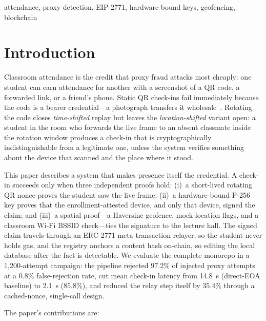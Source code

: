 \documentclass[conference]{IEEEtran}
\begin{document}
\begin{IEEEkeywords}
attendance, proxy detection, EIP-2771, hardware-bound keys, geofencing,
blockchain
\end{IEEEkeywords}

\section{Introduction}
Classroom attendance is the credit that proxy fraud attacks
most cheaply: one student can earn attendance for another with a screenshot of
a QR code, a forwarded link, or a friend's phone. Static QR check-ins fail
immediately because the code is a bearer credential---a photograph transfers
it wholesale~\cite{nuhi2020smartattendance,liew2021qrattendance}. Rotating
the code closes \emph{time-shifted} replay but leaves the
\emph{location-shifted} variant open: a student in the room who forwards the
live frame to an absent classmate inside the rotation window produces a
check-in that is cryptographically indistinguishable from a legitimate one,
unless the system verifies something about the device that scanned and the
place where it stood.

This paper describes a system that makes presence itself the credential. A
check-in succeeds only when three independent proofs hold: (i)~a
short-lived rotating QR nonce proves the student saw the live frame;
(ii)~a hardware-bound P-256 key proves that the enrollment-attested device,
and only that device, signed the claim; and (iii)~a spatial proof---a
Haversine geofence, mock-location flags, and a classroom Wi-Fi BSSID
check---ties the signature to the lecture hall. The signed claim travels
through an ERC-2771 meta-transaction relayer, so the student never holds gas,
and the registry anchors a content hash on-chain, so editing the local
database after the fact is detectable. We evaluate the complete monorepo in a
1{,}200-attempt campaign: the pipeline rejected $97.2\%$ of injected proxy
attempts at a $0.8\%$ false-rejection rate, cut mean check-in latency from
14.8~s (direct-EOA baseline) to 2.1~s ($85.8\%$), and reduced the relay step
itself by $35.4\%$ through a cached-nonce, single-call design.

The paper's contributions are:
\end{document}

